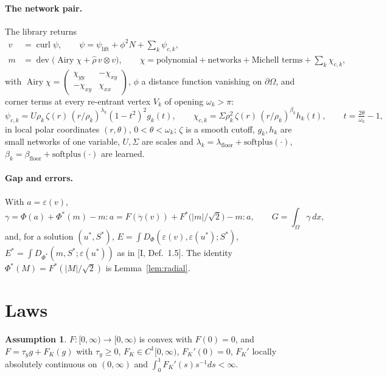 \documentclass[11pt]{article}
\theoremstyle{definition}
\newtheorem{assumption}[theorem]{Assumption}
\newcommand{\eps}{\varepsilon}
\newcommand{\gd}{\dot\gamma}
\newcommand{\dev}{\operatorname{dev}}
\newcommand{\Airy}{\operatorname{Airy}}
\begin{document}
\paragraph{The network pair.} The library returns
\begin{align*}
v&=\operatorname{curl}\psi,\qquad \psi=\psi_{\mathrm{lift}}+\phi^2N+\sum_k \psi_{c,k},\\
m&=\dev\big(\Airy\chi+\hat\rho\, v\otimes v\big),\qquad \chi=\text{polynomial}+\text{networks}+\text{Michell terms}+\sum_k\chi_{c,k},
\end{align*}
with $\Airy\chi=\begin{pmatrix}\chi_{yy}&-\chi_{xy}\\-\chi_{xy}&\chi_{xx}\end{pmatrix}$, $\phi$ a distance function
vanishing on $\partial\Omega$, and corner terms at every re-entrant vertex $V_k$ of opening $\omega_k>\pi$:
\[
\psi_{c,k}=U\rho_k\,\zeta(r)\,(r/\rho_k)^{\lambda_k}(1-t^2)^2 g_k(t),\qquad
\chi_{c,k}=\Sigma\rho_k^2\,\zeta(r)\,(r/\rho_k)^{\beta_k}h_k(t),\qquad t=\tfrac{2\theta}{\omega_k}-1,
\]
in local polar coordinates $(r,\theta)$, $0<\theta<\omega_k$; $\zeta$ is a smooth cutoff, $g_k,h_k$ are small
networks of one variable, $U,\Sigma$ are scales and
$\lambda_k=\lambda_{\mathrm{floor}}+\mathrm{softplus}(\cdot)$, $\beta_k=\beta_{\mathrm{floor}}+\mathrm{softplus}(\cdot)$
are learned.

\paragraph{Gap and errors.} With $a=\eps(v)$,
\[
\gamma=\Phi(a)+\Phi^*(m)-m:a=F(\gd(v))+F^*\!\big(|m|/\sqrt2\big)-m:a,\qquad G=\int_\Omega\gamma\,dx,
\]
and, for a solution $(u^*,S^*)$, $E=\int D_\Phi(\eps(v),\eps(u^*);S^*)$, $E^*=\int D_{\Phi^*}(m,S^*;\eps(u^*))$ as in [I, Def.~1.5].
The identity $\Phi^*(M)=F^*(|M|/\sqrt2)$ is Lemma~\ref{lem:radial}.

\section{Laws}

\begin{assumption}\label{ass:F}
$F:[0,\infty)\to[0,\infty)$ is convex with $F(0)=0$, and $F=\tau_y g+F_K(g)$ with $\tau_y\ge0$, $F_K\in C^1[0,\infty)$,
$F_K'(0)=0$, $F_K'$ locally absolutely continuous on $(0,\infty)$ and $\int_0^1F_K'(s)s^{-1}ds<\infty$.
\end{assumption}
\end{document}
